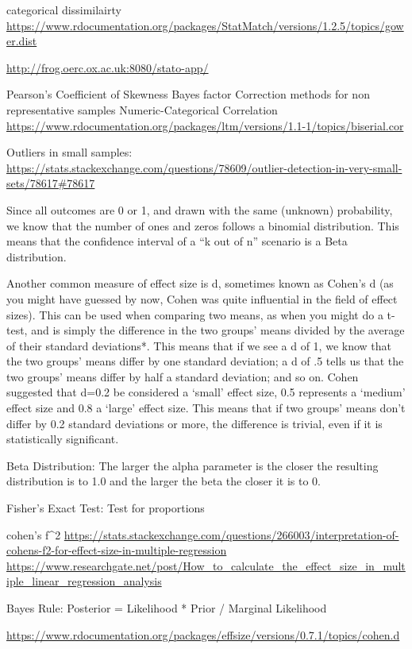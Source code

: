 \documentclass[]{book}
\begin{document}
categorical dissimilairty
\url{https://www.rdocumentation.org/packages/StatMatch/versions/1.2.5/topics/gower.dist}

\url{http://frog.oerc.ox.ac.uk:8080/stato-app/}

Pearson's Coefficient of Skewness \textbar{} Bayes factor \textbar{}
Correction methods for non representative samples \textbar{}
Numeric-Categorical Correlation
\url{https://www.rdocumentation.org/packages/ltm/versions/1.1-1/topics/biserial.cor}

Outliers in small samples:
\url{https://stats.stackexchange.com/questions/78609/outlier-detection-in-very-small-sets/78617\#78617}

Since all outcomes are 0 or 1, and drawn with the same (unknown)
probability, we know that the number of ones and zeros follows a
binomial distribution. This means that the confidence interval of a ``k
out of n'' scenario is a Beta distribution.

Another common measure of effect size is d, sometimes known as Cohen's d
(as you might have guessed by now, Cohen was quite influential in the
field of effect sizes). This can be used when comparing two means, as
when you might do a t-test, and is simply the difference in the two
groups' means divided by the average of their standard deviations*. This
means that if we see a d of 1, we know that the two groups' means differ
by one standard deviation; a d of .5 tells us that the two groups' means
differ by half a standard deviation; and so on. Cohen suggested that
d=0.2 be considered a `small' effect size, 0.5 represents a `medium'
effect size and 0.8 a `large' effect size. This means that if two
groups' means don't differ by 0.2 standard deviations or more, the
difference is trivial, even if it is statistically significant.

Beta Distribution: The larger the alpha parameter is the closer the
resulting distribution is to 1.0 and the larger the beta the closer it
is to 0.

Fisher's Exact Test: Test for proportions

cohen's f\^{}2 \textbar{}
\url{https://stats.stackexchange.com/questions/266003/interpretation-of-cohens-f2-for-effect-size-in-multiple-regression}
\textbar{}
\url{https://www.researchgate.net/post/How_to_calculate_the_effect_size_in_multiple_linear_regression_analysis}

Bayes Rule: Posterior = Likelihood * Prior / Marginal Likelihood

\url{https://www.rdocumentation.org/packages/effsize/versions/0.7.1/topics/cohen.d}
\end{document}
